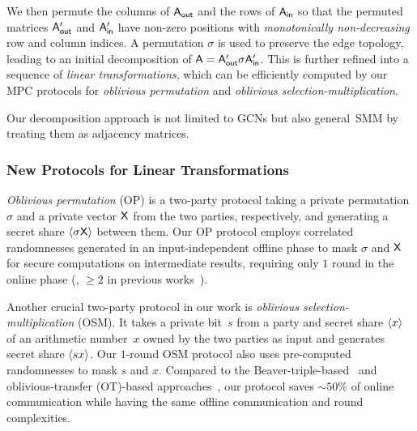 
We then permute the columns of $\mathsf{A}_{\mathsf{out}}$ and the rows of $\mathsf{A}_{\mathsf{in}}$ so that the permuted matrices $\mathsf{A}_{\mathsf{out}}'$ and $\mathsf{A}_{\mathsf{in}}'$ have non-zero positions with \emph{monotonically non-decreasing} row and column indices.
A permutation $\sigma$ is used to preserve the edge topology, leading to an initial decomposition of $\mathsf{A} = \mathsf{A}_{\mathsf{out}}'\sigma \mathsf{A}_{\mathsf{in}}'$.
This is further refined into a sequence of \emph{linear transformations}, 
which can be efficiently computed by our MPC protocols for 
\emph{oblivious permutation}
and \emph{oblivious selection-multiplication}.
\iffalse
Our approach leverages bipartite graph representation and the monotonicity of non-zero positions to decompose a general sparse matrix into linear transformations, enhancing the efficiency of our MPC protocols.
\fi
Our decomposition approach is not limited to GCNs but also general~SMM 
by 
treating them 
as adjacency matrices.


 
\subsubsection{New Protocols for Linear Transformations}
\emph{Oblivious permutation} (OP) is a two-party protocol taking a private permutation $\sigma$ and a private vector $\mathsf{X}$ from the two parties, respectively, and generating a secret share $\langle\sigma \mathsf{X}\rangle$ between them.
Our OP protocol employs correlated randomnesses generated in an input-independent offline phase to mask $\sigma$ and $\mathsf{X}$ for secure computations on intermediate results, requiring only $1$ round in the online phase (\cf, $\ge 2$ in previous works~\cite{ccs/AsharovHIKNPTT22, ccs/Araki0OPRT21}).

Another crucial two-party protocol in our work is \emph{oblivious selection-multiplication} (OSM).
It takes a private bit~$s$ from a party and secret share $\langle x\rangle$ of an arithmetic number~$x$ owned by the two parties as input and generates secret share $\langle sx\rangle$.
Our $1$-round OSM protocol also uses pre-computed randomnesses to mask $s$ and $x$.
Compared to the Beaver-triple-based~\cite{crypto/Beaver91a} and oblivious-transfer (OT)-based approaches~\cite{pkc/Tzeng02}, our protocol saves ${\sim}50\%$ of online communication while having the same offline communication and round complexities.

